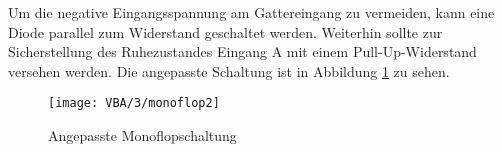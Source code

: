 Um die negative Eingangsspannung am Gattereingang zu vermeiden, kann eine Diode
parallel zum Widerstand geschaltet werden. Weiterhin sollte zur Sicherstellung
des Ruhezustandes Eingang A mit einem Pull-Up-Widerstand versehen werden. Die
angepasste Schaltung ist in Abbildung \ref{fig:monoflop3} zu sehen.

\begin{figure}[]
  \begin{center}
    \texttt{[image: VBA/3/monoflop2]}
  \end{center}
  \caption{Angepasste Monoflopschaltung}
  \label{fig:monoflop3}
\end{figure}
